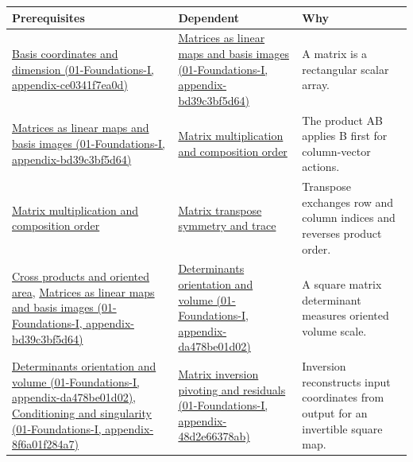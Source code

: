 {\def\LTcaptype{none} %
\begin{longtable}[]{@{}
  >{\raggedright\arraybackslash}p{}
  >{\raggedright\arraybackslash}p{}
  >{\raggedright\arraybackslash}p{}@{}}
\toprule\noalign{}
\begin{minipage}[b]{\linewidth}\raggedright
Prerequisites
\end{minipage} & \begin{minipage}[b]{\linewidth}\raggedright
Dependent
\end{minipage} & \begin{minipage}[b]{\linewidth}\raggedright
Why
\end{minipage} \\
\midrule\noalign{}
\endhead
\bottomrule\noalign{}
\endlastfoot
\href{../01-Foundations-I/main.pdf\#nameddest=appendix-ce0341f7ea0d}{Basis coordinates and dimension (01-Foundations-I, appendix-ce0341f7ea0d)} & \href{../01-Foundations-I/main.pdf\#nameddest=appendix-bd39c3bf5d64}{Matrices as linear maps and basis images (01-Foundations-I, appendix-bd39c3bf5d64)} & A matrix is a rectangular scalar array. \\
\href{../01-Foundations-I/main.pdf\#nameddest=appendix-bd39c3bf5d64}{Matrices as linear maps and basis images (01-Foundations-I, appendix-bd39c3bf5d64)} & \hyperref[appendix-ab31ef447dbf]{Matrix multiplication and composition order} & The product AB applies B first for column-vector actions. \\
\hyperref[appendix-ab31ef447dbf]{Matrix multiplication and composition order} & \hyperref[appendix-175ca5ff874d]{Matrix transpose symmetry and trace} & Transpose exchanges row and column indices and reverses product order. \\
\hyperref[appendix-2391db8052b1]{Cross products and oriented area}, \href{../01-Foundations-I/main.pdf\#nameddest=appendix-bd39c3bf5d64}{Matrices as linear maps and basis images (01-Foundations-I, appendix-bd39c3bf5d64)} & \href{../01-Foundations-I/main.pdf\#nameddest=appendix-da478be01d02}{Determinants orientation and volume (01-Foundations-I, appendix-da478be01d02)} & A square matrix determinant measures oriented volume scale. \\
\href{../01-Foundations-I/main.pdf\#nameddest=appendix-da478be01d02}{Determinants orientation and volume (01-Foundations-I, appendix-da478be01d02)}, \href{../01-Foundations-I/main.pdf\#nameddest=appendix-8f6a01f284a7}{Conditioning and singularity (01-Foundations-I, appendix-8f6a01f284a7)} & \href{../01-Foundations-I/main.pdf\#nameddest=appendix-48d2e66378ab}{Matrix inversion pivoting and residuals (01-Foundations-I, appendix-48d2e66378ab)} & Inversion reconstructs input coordinates from output for an invertible square map. \\

\end{longtable}}
